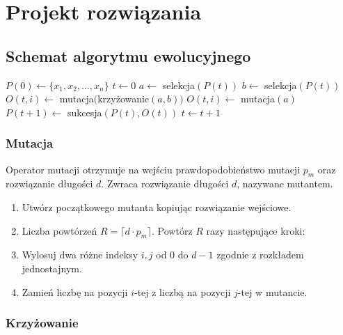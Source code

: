 \documentclass[12pt, a4paper]{article}
\begin{document}
\section{Projekt rozwiązania}

\subsection{Schemat algorytmu ewolucyjnego}

\begin{algorithm}[!htb]
\label{ea}
\begin{algorithmic}[1]
  \State $P(0) \gets \{x_1, x_2, \ldots, x_n\}$
  \State $t \gets 0$
      \State $a \gets$ selekcja$(P(t))$
	\State $b \gets$ selekcja$(P(t))$
	\State $O(t,i) \gets$ mutacja$($krzy{\.z}owanie$(a, b))$
      \Else
	\State $O(t,i) \gets$ mutacja$(a)$
      \EndIf
    \EndFor
    \State $P(t+1) \gets$ sukcesja$(P(t),O(t))$
    \State $t \gets t+1$
  \EndWhile
\EndFunction
\end{algorithmic}
\end{algorithm}

\subsubsection{Mutacja}

Operator mutacji otrzymuje na wejściu prawdopodobieństwo mutacji $p_m$ oraz rozwiązanie długości $d$.
Zwraca rozwiązanie długości $d$, nazywane mutantem.

\begin{enumerate}
 \item Utwórz początkowego mutanta kopiując rozwiązanie wejściowe.
 \item Liczba powtórzeń $R = \lceil d \cdot  p_m \rceil$. Powtórz $R$ razy następujące kroki:
 \item Wylosuj dwa różne indeksy $i, j$ od 0 do $d-1$ zgodnie z rozkładem jednostajnym.
 \item Zamień liczbę na pozycji $i$-tej z liczbą na pozycji $j$-tej w mutancie.
\end{enumerate}

\subsubsection{Krzyżowanie}
\end{document}
